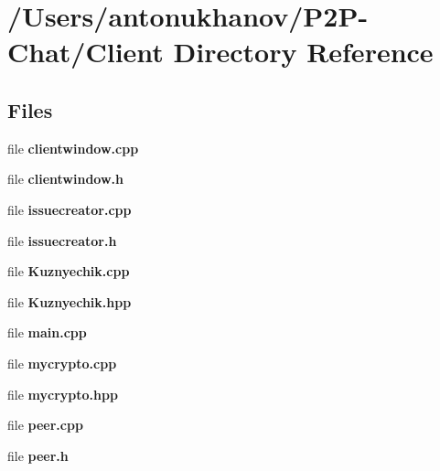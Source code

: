 \section{/\+Users/antonukhanov/\+P2\+P-\/\+Chat/\+Client Directory Reference}
\label{dir_922c588100a187620fdc1533bc178f73}
\subsection*{Files}
\begin{DoxyCompactItemize}
\item 
file \textbf{ clientwindow.\+cpp}
\item 
file \textbf{ clientwindow.\+h}
\item 
file \textbf{ issuecreator.\+cpp}
\item 
file \textbf{ issuecreator.\+h}
\item 
file \textbf{ Kuznyechik.\+cpp}
\item 
file \textbf{ Kuznyechik.\+hpp}
\item 
file \textbf{ main.\+cpp}
\item 
file \textbf{ mycrypto.\+cpp}
\item 
file \textbf{ mycrypto.\+hpp}
\item 
file \textbf{ peer.\+cpp}
\item 
file \textbf{ peer.\+h}
\end{DoxyCompactItemize}
